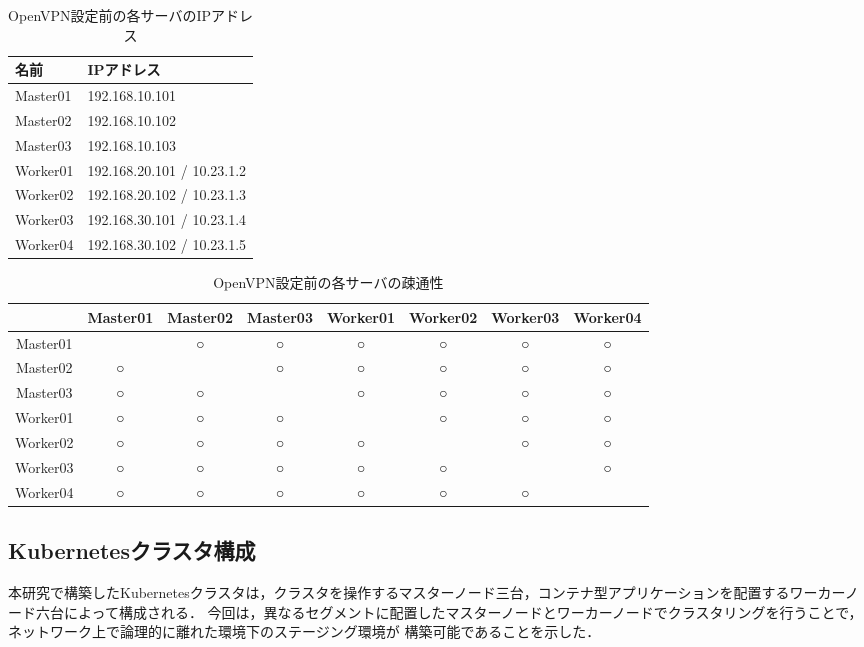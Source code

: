 \begin{table}[htb]
  \begin{center}
    \caption{OpenVPN設定前の各サーバのIPアドレス}
    \begin{tabular}{|l|l|} \hline
      名前 & IPアドレス \\ \hline
      Master01 & 192.168.10.101 \\ \hline
      Master02 & 192.168.10.102 \\ \hline
      Master03 & 192.168.10.103 \\ \hline
      Worker01 & 192.168.20.101 / 10.23.1.2 \\ \hline
      Worker02 & 192.168.20.102 / 10.23.1.3 \\ \hline
      Worker03 & 192.168.30.101 / 10.23.1.4 \\ \hline
      Worker04 & 192.168.30.102 / 10.23.1.5 \\ \hline
    \end{tabular}
  \end{center}
\end{table}

\begin{table}[htb]
  \begin{center}
    \caption{OpenVPN設定前の各サーバの疎通性}
    \begin{tabular}{|c|c|c|c|c|c|c|c|} \hline
      & Master01 & Master02 & Master03 & Worker01 & Worker02 & Worker03 & Worker04 \\ \hline
      Master01 & \ & ○ & ○ & ○ & ○ & ○ & ○ \\ \hline
      Master02 & ○ & \ & ○ & ○ & ○ & ○ & ○ \\ \hline
      Master03 & ○ & ○ & \ & ○ & ○ & ○ & ○ \\ \hline
      Worker01 & ○ & ○ & ○ & \ & ○ & ○ & ○ \\ \hline
      Worker02 & ○ & ○ & ○ & ○ & \ & ○ & ○ \\ \hline
      Worker03 & ○ & ○ & ○ & ○ & ○ & \ & ○ \\ \hline
      Worker04 & ○ & ○ & ○ & ○ & ○ & ○ & \ \\ \hline
    \end{tabular}
  \end{center}
\end{table}

\subsection{Kubernetesクラスタ構成}
\label{implementation:kubernetes-environment}
本研究で構築したKubernetesクラスタは，クラスタを操作するマスターノード三台，コンテナ型アプリケーションを配置するワーカーノード六台によって構成される．
今回は，異なるセグメントに配置したマスターノードとワーカーノードでクラスタリングを行うことで，ネットワーク上で論理的に離れた環境下のステージング環境が
構築可能であることを示した．

